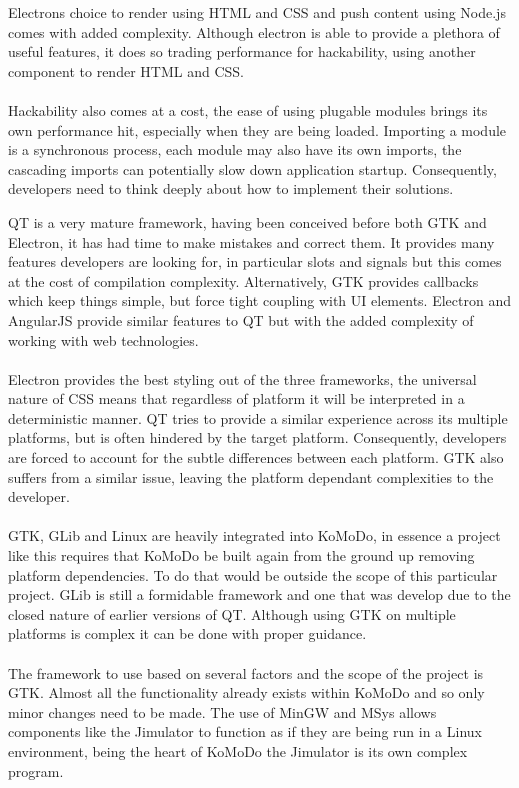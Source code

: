   Electrons choice to render using HTML and CSS and push content using Node.js comes with added complexity. Although electron is able to provide a plethora of useful features, it does so trading performance for hackability, using another component to render HTML and CSS.\\\\
  Hackability also comes at a cost, the ease of using plugable modules brings its own performance hit, especially when they are being loaded. Importing a module is a synchronous process, each module may also have its own imports, the cascading imports can potentially slow down application startup. Consequently, developers need to think deeply about how to implement their solutions.

QT is a very mature framework, having been conceived before both GTK and Electron, it has had time to make mistakes and correct them. It provides many features developers are looking for, in particular slots and signals but this comes at the cost of compilation complexity. Alternatively, GTK provides callbacks which keep things simple, but force tight coupling with UI elements. Electron and AngularJS provide similar features to QT but with the added complexity of working with web technologies.\\\\
%
Electron provides the best styling out of the three frameworks, the universal nature of CSS means that regardless of platform it will be interpreted in a deterministic manner. QT tries to provide a similar experience across its multiple platforms, but is often hindered by the target platform. Consequently, developers are forced to account for the subtle differences between each platform. GTK also suffers from a similar issue, leaving the platform dependant complexities to the developer.\\\\
%
GTK, GLib and Linux are heavily integrated into KoMoDo, in essence a project like this requires that KoMoDo be built again from the ground up removing platform dependencies. To do that would be outside the scope of this particular project. GLib is still a formidable framework and one that was develop due to the closed nature of earlier versions of QT. Although using GTK on multiple platforms is complex it can be done with proper guidance.\\\\
%
The framework to use based on several factors and the scope of the project is GTK. Almost all the functionality already exists within KoMoDo and so only minor changes need to be made. The use of MinGW and MSys allows components like the Jimulator to function as if they are being run in a Linux environment, being the heart of KoMoDo the Jimulator is its own complex program.

